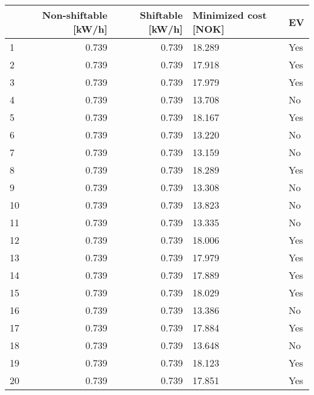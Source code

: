 \begin{tabular}{lrrll}
\toprule
{} &  Non-shiftable [kW/h] &  Shiftable [kW/h] & Minimized cost [NOK] &   EV \\
\midrule
1  &                 0.739 &             0.739 &               18.289 &  Yes \\
2  &                 0.739 &             0.739 &               17.918 &  Yes \\
3  &                 0.739 &             0.739 &               17.979 &  Yes \\
4  &                 0.739 &             0.739 &               13.708 &   No \\
5  &                 0.739 &             0.739 &               18.167 &  Yes \\
6  &                 0.739 &             0.739 &               13.220 &   No \\
7  &                 0.739 &             0.739 &               13.159 &   No \\
8  &                 0.739 &             0.739 &               18.289 &  Yes \\
9  &                 0.739 &             0.739 &               13.308 &   No \\
10 &                 0.739 &             0.739 &               13.823 &   No \\
11 &                 0.739 &             0.739 &               13.335 &   No \\
12 &                 0.739 &             0.739 &               18.006 &  Yes \\
13 &                 0.739 &             0.739 &               17.979 &  Yes \\
14 &                 0.739 &             0.739 &               17.889 &  Yes \\
15 &                 0.739 &             0.739 &               18.029 &  Yes \\
16 &                 0.739 &             0.739 &               13.386 &   No \\
17 &                 0.739 &             0.739 &               17.884 &  Yes \\
18 &                 0.739 &             0.739 &               13.648 &   No \\
19 &                 0.739 &             0.739 &               18.123 &  Yes \\
20 &                 0.739 &             0.739 &               17.851 &  Yes \\

\end{tabular}
